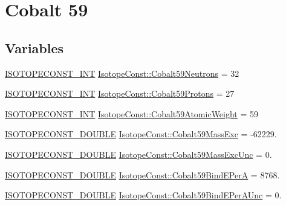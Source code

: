 \hypertarget{group___isotope_const-_cobalt-_co59}{}\section{Cobalt 59}
\label{group___isotope_const-_cobalt-_co59}
\subsection*{Variables}
\begin{DoxyCompactItemize}
\item 
\mbox{\hyperlink{group___isotope_const-_macros_ga5f18360b3e99483a35c32d789e62621c}{I\+S\+O\+T\+O\+P\+E\+C\+O\+N\+S\+T\+\_\+\+I\+NT}} \mbox{\hyperlink{group___isotope_const-_cobalt-_co59_ga719832f7b0f1c7b54acd03bea2b80f4e}{Isotope\+Const\+::\+Cobalt59\+Neutrons}} = 32
\item 
\mbox{\hyperlink{group___isotope_const-_macros_ga5f18360b3e99483a35c32d789e62621c}{I\+S\+O\+T\+O\+P\+E\+C\+O\+N\+S\+T\+\_\+\+I\+NT}} \mbox{\hyperlink{group___isotope_const-_cobalt-_co59_ga0bcd3e47b5faf613283b0d8a0f720e92}{Isotope\+Const\+::\+Cobalt59\+Protons}} = 27
\item 
\mbox{\hyperlink{group___isotope_const-_macros_ga5f18360b3e99483a35c32d789e62621c}{I\+S\+O\+T\+O\+P\+E\+C\+O\+N\+S\+T\+\_\+\+I\+NT}} \mbox{\hyperlink{group___isotope_const-_cobalt-_co59_gaef8c9a4df412eab0c7185968911ff724}{Isotope\+Const\+::\+Cobalt59\+Atomic\+Weight}} = 59
\item 
\mbox{\hyperlink{group___isotope_const-_macros_ga8f45a7272ce02c0b4c65c44636ed719a}{I\+S\+O\+T\+O\+P\+E\+C\+O\+N\+S\+T\+\_\+\+D\+O\+U\+B\+LE}} \mbox{\hyperlink{group___isotope_const-_cobalt-_co59_ga40a483d05e28995576f5b405be63ec69}{Isotope\+Const\+::\+Cobalt59\+Mass\+Exc}} = -\/62229.
\item 
\mbox{\hyperlink{group___isotope_const-_macros_ga8f45a7272ce02c0b4c65c44636ed719a}{I\+S\+O\+T\+O\+P\+E\+C\+O\+N\+S\+T\+\_\+\+D\+O\+U\+B\+LE}} \mbox{\hyperlink{group___isotope_const-_cobalt-_co59_ga58c2525daaaa72c654ecf8f514687ece}{Isotope\+Const\+::\+Cobalt59\+Mass\+Exc\+Unc}} = 0.
\item 
\mbox{\hyperlink{group___isotope_const-_macros_ga8f45a7272ce02c0b4c65c44636ed719a}{I\+S\+O\+T\+O\+P\+E\+C\+O\+N\+S\+T\+\_\+\+D\+O\+U\+B\+LE}} \mbox{\hyperlink{group___isotope_const-_cobalt-_co59_gaaecd2eb128718accd06e27197f43f9cf}{Isotope\+Const\+::\+Cobalt59\+Bind\+E\+PerA}} = 8768.
\item 
\mbox{\hyperlink{group___isotope_const-_macros_ga8f45a7272ce02c0b4c65c44636ed719a}{I\+S\+O\+T\+O\+P\+E\+C\+O\+N\+S\+T\+\_\+\+D\+O\+U\+B\+LE}} \mbox{\hyperlink{group___isotope_const-_cobalt-_co59_ga1fab2361cddc0f823bba663a768b7098}{Isotope\+Const\+::\+Cobalt59\+Bind\+E\+Per\+A\+Unc}} = 0.

\end{DoxyCompactItemize}
